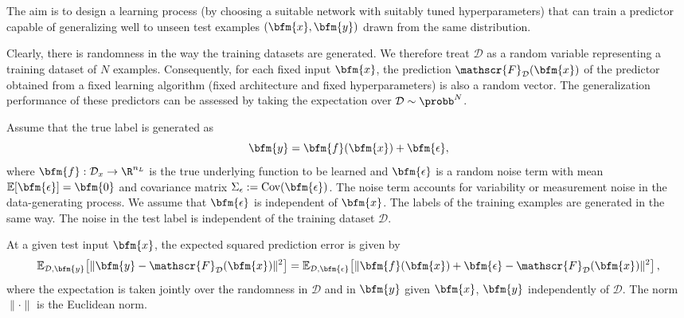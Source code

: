
The aim is to design a learning process (by choosing a suitable network with suitably tuned hyperparameters) that can train a predictor capable of generalizing well to unseen test examples $(\bfm{x},\bfm{y})$ drawn from the same distribution.

Clearly, there is randomness in the way the training datasets are generated. We therefore treat $\mathcal{D}$ as a random variable representing a training dataset of $N$ examples.  Consequently, for each fixed input $\bfm{x}$, the prediction $\mathscr{F}_{\mathcal{D}}(\bfm{x})$ of the predictor obtained from a fixed learning algorithm (fixed architecture and fixed hyperparameters) is also a random vector.  The generalization performance of these predictors can be assessed by taking the expectation over $\mathcal{D}\sim\probb^N$.

Assume that the true label is generated as
$$\bfm{y} = \bfm{f}(\bfm{x}) + \bfm{\epsilon},$$
where $\bfm{f}:\mathcal{D}_x\rightarrow\R^{n_L}$ is the true underlying function to be learned and $\bfm{\epsilon}$ is a random noise term with mean $\mathbb{E}[\bfm{\epsilon}] = \bfm{0}$ and covariance matrix $\Sigma_\epsilon := \mathrm{Cov}(\bfm{\epsilon})$. The noise term accounts for variability or measurement noise in the data-generating process. We assume that $\bfm{\epsilon}$ is independent of $\bfm{x}$. The labels of the training examples are generated in the same way. The noise in the test label is independent of the training dataset $\mathcal{D}$.

At a given test input $\bfm{x}$, the expected squared prediction error is given by
$$
\mathbb{E}_{\mathcal{D}, \bfm{y}}\!\left[\|\bfm{y} - \mathscr{F}_{\mathcal{D}}(\bfm{x})\|^2\right]
=
\mathbb{E}_{\mathcal{D}, \bfm{\epsilon}}\!\left[\|\bfm{f}(\bfm{x}) + \bfm{\epsilon} - \mathscr{F}_{\mathcal{D}}(\bfm{x})\|^2\right],
$$
where  the expectation is taken jointly over the randomness in $\mathcal{D}$ and in $\bfm{y}$ given $\bfm{x}$, $\bfm{y}$ independently of $\mathcal{D}$. The norm $\|\cdot\|$ is the Euclidean norm.

